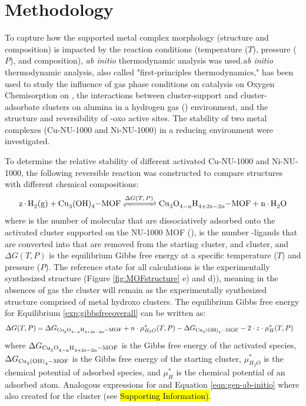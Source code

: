 \documentclass[journal=jctcce,manuscript=article]{achemso}
\begin{document}
\section{Methodology}
To capture how the supported metal complex morphology (structure and composition) is impacted by the reaction conditions (temperature ($T$), pressure ($P$), and composition), \textit{ab initio} thermodynamic analysis was used.\textit{ab initio} thermodynamic analysis, also called "first-principles thermodynamics," has been used to study the influence of gas phase conditions on catalysis on Oxygen Chemisorption on ,\cite{Getman2008} the interactions between cluster-support and cluster-adsorbate  clusters on alumina in a hydrogen gas () environment,\cite{Sun2019} and the structure and reversibility of -oxo active sites.\cite{Grundner2015,Li2016,Paolucci2016} The stability of two metal complexes (Cu-NU-1000 and Ni-NU-1000) in a reducing environment were investigated.  

To determine the relative stability of different activated Cu-NU-1000 and Ni-NU-1000, the following reversible reaction was constructed  to compare structures with different chemical compositions: 
\begin{equation} \label{exp:gibbsfreeoverall}
    \ce{z * H2 (g) + Cu3(OH)4-MOF <=>[$\Delta G(T,P)$] Cu3O_{4-n}H_{4+2z-2n}-MOF + n * H2O}
\end{equation}
where  is the number of molecular  that are dissociatively adsorbed onto the activated cluster supported on the NU-1000 MOF (),  is the number -ligands that are converted into  that are removed from the starting cluster, and  cluster, and $\Delta G(T,P)$ is the equilibrium Gibbs free energy at a specific temperature ($T$) and pressure ($P$). The reference state for all calculations is the experimentally synthesized structure (Figure \ref{fig:MOFstructure} e) and d)), meaning in the absences of  gas the cluster will remain as the experimentally synthesized structure comprised of metal hydroxo clusters. The equilibrium Gibbs free energy for Equilibrium \ref{exp:gibbsfreeoverall} can be written as:
\begin{equation} \label{eqn:gen-ab-initio}
    \begin{split}
        \Delta G(T,P) & = \Delta G_{\ce{Cu3O_{4-n}H_{4+2z-2n}-MOF}} + n \cdot \mu_{H_{2}O}^{*}(T,P) - \Delta G_{\ce{Cu3(OH)4-MOF}} - 2 \cdot z \cdot \mu_{H}^{*}(T,P)
    \end{split}
\end{equation}
where $\Delta G_{\ce{Cu3O_{4-n}H_{4+2z-2n}-MOF}}$ is the Gibbs free energy of the activated species, $\Delta G_{\ce{Cu3(OH)4-MOF}}$ is the Gibbs free energy of the starting cluster, $\mu_{H_{2}O}^{*}$ is the chemical potential of  adsorbed species, and $\mu_{H}^{*}$ is the chemical potential of an adsorbed  atom. Analogous expressions for and Equation \ref{eqn:gen-ab-initio} where also created for the  cluster (see \hl{Supporting Information)}. 
\end{document}
